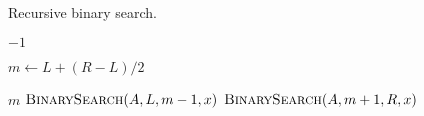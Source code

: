 
\begin{algorithm}[H]
  \caption{Recursive binary search.}
  \begin{algorithmic}[1]
	\State \Return $-1$
      \EndIf

      \hStatex
      \State $m \gets L + (R - L) / 2$

      \hStatex
	\State \Return $m$
	\State \Return $\Call{BinarySearch}{A, L, m-1, x}$
      \Else
	\State \Return $\Call{BinarySearch}{A, m+1, R, x}$
      \EndIf
    \EndProcedure
  \end{algorithmic}
\end{algorithm}
